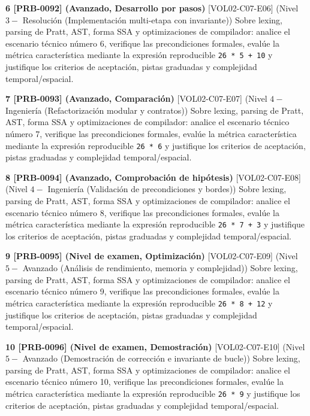 \documentclass{book}
\begin{document}
\begin{tcolorbox}[title={Ejercicios}, studiumworked, breakable]
\noindent\textbf{6 [PRB-0092] (Avanzado, Desarrollo por pasos)}
[VOL02-C07-E06] (Nivel \(3 -\) Resolución (Implementación multi-etapa con invariante)) Sobre lexing, parsing de Pratt, AST, forma SSA y optimizaciones de compilador: analice el escenario técnico número 6, verifique las precondiciones formales, evalúe la métrica característica mediante la expresión reproducible \texttt{26 * 5 + 10} y justifique los criterios de aceptación, pistas graduadas y complejidad temporal/espacial.

\noindent\textbf{7 [PRB-0093] (Avanzado, Comparación)}
[VOL02-C07-E07] (Nivel \(4 -\) Ingeniería (Refactorización modular y contratos)) Sobre lexing, parsing de Pratt, AST, forma SSA y optimizaciones de compilador: analice el escenario técnico número 7, verifique las precondiciones formales, evalúe la métrica característica mediante la expresión reproducible \texttt{26 * 6} y justifique los criterios de aceptación, pistas graduadas y complejidad temporal/espacial.

\noindent\textbf{8 [PRB-0094] (Avanzado, Comprobación de hipótesis)}
[VOL02-C07-E08] (Nivel \(4 -\) Ingeniería (Validación de precondiciones y bordes)) Sobre lexing, parsing de Pratt, AST, forma SSA y optimizaciones de compilador: analice el escenario técnico número 8, verifique las precondiciones formales, evalúe la métrica característica mediante la expresión reproducible \texttt{26 * 7 + 3} y justifique los criterios de aceptación, pistas graduadas y complejidad temporal/espacial.

\noindent\textbf{9 [PRB-0095] (Nivel de examen, Optimización)}
[VOL02-C07-E09] (Nivel \(5 -\) Avanzado (Análisis de rendimiento, memoria y complejidad)) Sobre lexing, parsing de Pratt, AST, forma SSA y optimizaciones de compilador: analice el escenario técnico número 9, verifique las precondiciones formales, evalúe la métrica característica mediante la expresión reproducible \texttt{26 * 8 + 12} y justifique los criterios de aceptación, pistas graduadas y complejidad temporal/espacial.

\noindent\textbf{10 [PRB-0096] (Nivel de examen, Demostración)}
[VOL02-C07-E10] (Nivel \(5 -\) Avanzado (Demostración de corrección e invariante de bucle)) Sobre lexing, parsing de Pratt, AST, forma SSA y optimizaciones de compilador: analice el escenario técnico número 10, verifique las precondiciones formales, evalúe la métrica característica mediante la expresión reproducible \texttt{26 * 9} y justifique los criterios de aceptación, pistas graduadas y complejidad temporal/espacial.


\end{tcolorbox}
\end{document}
